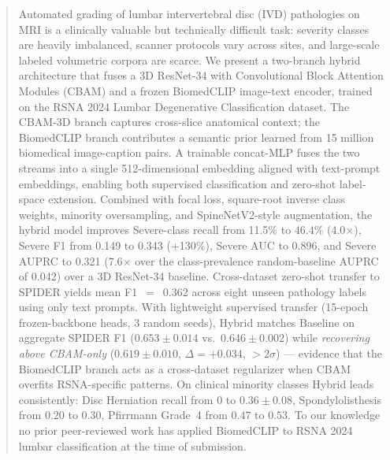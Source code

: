 \documentclass[runningheads]{llncs}
\begin{document}
\begin{abstract}
Automated grading of lumbar intervertebral disc (IVD) pathologies on MRI is
a clinically valuable but technically difficult task: severity classes are
heavily imbalanced, scanner protocols vary across sites, and large-scale
labeled volumetric corpora are scarce. We present a two-branch hybrid
architecture that fuses a 3D ResNet-34 with Convolutional Block Attention
Modules (CBAM) and a frozen BiomedCLIP image-text encoder, trained on
the RSNA 2024 Lumbar Degenerative Classification dataset. The CBAM-3D
branch captures cross-slice anatomical context; the BiomedCLIP branch
contributes a semantic prior learned from 15 million biomedical
image-caption pairs. A trainable concat-MLP fuses the two streams into a
single 512-dimensional embedding aligned with text-prompt embeddings,
enabling both supervised classification and zero-shot label-space
extension. Combined with focal loss, square-root inverse class weights,
minority oversampling, and SpineNetV2-style augmentation, the hybrid
model improves Severe-class recall from 11.5\% to 46.4\% (4.0$\times$),
Severe F1 from 0.149 to 0.343 (+130\%), Severe AUC to 0.896, and Severe
AUPRC to 0.321 (7.6$\times$ over the class-prevalence random-baseline
AUPRC of 0.042) over a 3D ResNet-34 baseline. Cross-dataset
zero-shot transfer to SPIDER yields mean F1~$=$~0.362 across eight
unseen pathology labels using only text prompts. With lightweight
supervised transfer (15-epoch frozen-backbone heads, 3 random seeds),
Hybrid matches Baseline on aggregate SPIDER F1 ($0.653 \pm 0.014$
vs.\ $0.646 \pm 0.002$) while \emph{recovering above CBAM-only}
($0.619 \pm 0.010$, $\Delta = +0.034$, $> 2\sigma$) --- evidence that
the BiomedCLIP branch acts as a cross-dataset regularizer when CBAM
overfits RSNA-specific patterns. On clinical minority classes Hybrid
leads consistently: Disc Herniation recall from $0$ to $0.36 \pm
0.08$, Spondylolisthesis from $0.20$ to $0.30$, Pfirrmann Grade~4
from $0.47$ to $0.53$. To our knowledge no prior peer-reviewed
work has applied BiomedCLIP to RSNA 2024 lumbar classification at
the time of submission.
\end{abstract}


\end{document}
